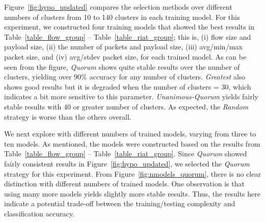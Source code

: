 \documentclass[conference]{IEEEtran}
\begin{document}
%


Figure~\ref{fig:hypo_updated} compares the selection methods over different numbers of clusters from 10 to 140 clusters in each training model.
For this experiment, we constructed four training models that showed the best results in Table~\ref{table_flow_group} -- Table~\ref{table_riat_group}; this is, (i) flow size and payload size, (ii) the number of packets and payload size, (iii) avg/min/max packet size, and (iv) avg/stdev packet size, for each trained model.
As can be seen from the figure, \emph{Quorum} shows quite stable results over the number of clusters, yielding over 90\% accuracy for any number of clusters.
\emph{Greatest} also shows good results but it is degraded when the number of clusters = 30, which indicates a bit more sensitive to this parameter.
\emph{Unanimous-Quorum} yields fairly stable results with 40 or greater number of clusters.
As expected, the \emph{Random} strategy is worse than the others overall.

We next explore with different numbers of trained models, varying from three to ten models.
As mentioned, the models were constructed based on the results from Table~\ref{table_flow_group} -- Table~\ref{table_riat_group}.
Since \emph{Quorum} showed fairly consistent results in Figure~\ref{fig:hypo_updated}, we selected the \emph{Quorum} strategy for this experiment.
From Figure~\ref{fig:nmodels_quorum}, there is  no clear distinction with different numbers of trained models.
One observation is that using many more models yields slightly more stable results.
Thus, the results here indicate a potential trade-off between the training/testing complexity and classification accuracy.
\end{document}
